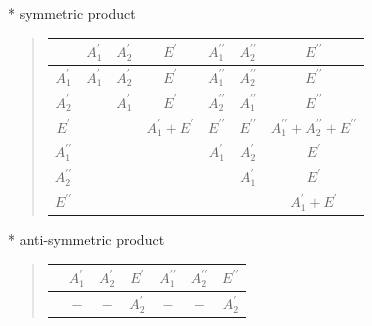 \documentclass[fleqn,8pt,landscape]{jsarticle}
\begin{document}
* symmetric product
\begin{quote}
\begin{tabular}{c|cccccc} \hline \hline
 & $ A_{1}^{\prime} $ & $ A_{2}^{\prime} $ & $ E^{\prime} $ & $ A_{1}^{\prime\prime} $ & $ A_{2}^{\prime\prime} $ & $ E^{\prime\prime} $ \\ \hline
$ A_{1}^{\prime} $ & $ A_{1}^{\prime} $ & $ A_{2}^{\prime} $ & $ E^{\prime} $ & $ A_{1}^{\prime\prime} $ & $ A_{2}^{\prime\prime} $ & $ E^{\prime\prime} $ \\
$ A_{2}^{\prime} $ & $  $ & $ A_{1}^{\prime} $ & $ E^{\prime} $ & $ A_{2}^{\prime\prime} $ & $ A_{1}^{\prime\prime} $ & $ E^{\prime\prime} $ \\
$ E^{\prime} $ & $  $ & $  $ & $ A_{1}^{\prime} + E^{\prime} $ & $ E^{\prime\prime} $ & $ E^{\prime\prime} $ & $ A_{1}^{\prime\prime} + A_{2}^{\prime\prime} + E^{\prime\prime} $ \\
$ A_{1}^{\prime\prime} $ & $  $ & $  $ & $  $ & $ A_{1}^{\prime} $ & $ A_{2}^{\prime} $ & $ E^{\prime} $ \\
$ A_{2}^{\prime\prime} $ & $  $ & $  $ & $  $ & $  $ & $ A_{1}^{\prime} $ & $ E^{\prime} $ \\
$ E^{\prime\prime} $ & $  $ & $  $ & $  $ & $  $ & $  $ & $ A_{1}^{\prime} + E^{\prime} $ \\
 \hline \hline
\end{tabular}
\end{quote}

* anti-symmetric product
\begin{quote}
\begin{tabular}{ccccccc} \hline \hline
 & $ A_{1}^{\prime} $ & $ A_{2}^{\prime} $ & $ E^{\prime} $ & $ A_{1}^{\prime\prime} $ & $ A_{2}^{\prime\prime} $ & $ E^{\prime\prime} $ \\ \hline
$  $ & $ - $ & $ - $ & $ A_{2}^{\prime} $ & $ - $ & $ - $ & $ A_{2}^{\prime} $ \\
 \hline \hline
\end{tabular}
\end{quote}
\end{document}

